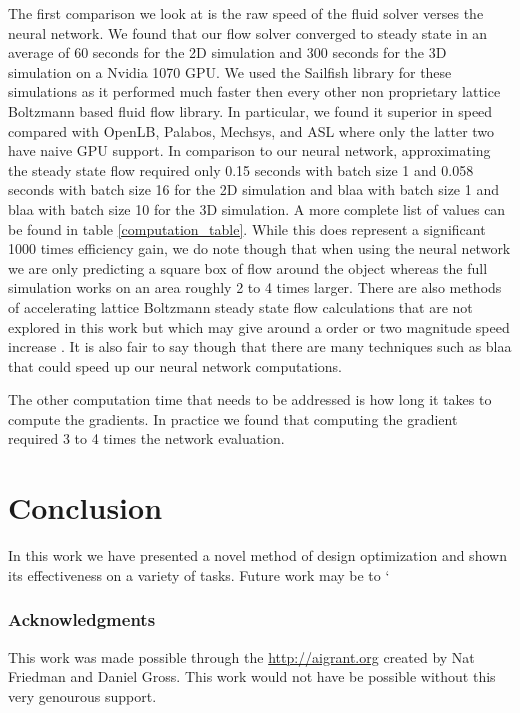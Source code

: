 \documentclass{article} %
\begin{document}
The first comparison we look at is the raw speed of the fluid solver verses the neural network. We found that our flow solver converged to steady state in an average of 60 seconds for the 2D simulation and 300 seconds for the 3D simulation on a Nvidia 1070 GPU. We used the Sailfish library \cite{januszewski2014sailfish} for these simulations as it performed much faster then every other non proprietary lattice Boltzmann based fluid flow library. In particular, we found it superior in speed compared with OpenLB, Palabos, Mechsys, and ASL where only the latter two have naive GPU support. In comparison to our neural network, approximating the steady state flow required only 0.15 seconds with batch size 1 and 0.058 seconds with batch size 16 for the 2D simulation and blaa with batch size 1 and blaa with batch size 10 for the 3D simulation. A more complete list of values can be found in table \ref{computation_table}. While this does represent a significant 1000 times efficiency gain, we do note though that when using the neural network we are only predicting a square box of flow around the object whereas the full simulation works on an area roughly 2 to 4 times larger. There are also methods of accelerating lattice Boltzmann steady state flow calculations that are not explored in this work but which may give around a order or two magnitude speed increase \cite{guo2013lattice} \cite{bernaschi2002computing}. It is also fair to say though that there are many techniques such as blaa that could speed up our neural network computations.

The other computation time that needs to be addressed is how long it takes to compute the gradients. In practice we found that computing the gradient required 3 to 4 times the network evaluation.




\section{Conclusion}

In this work we have presented a novel method of design optimization and shown its effectiveness on a variety of tasks. Future work may be to `

\subsubsection*{Acknowledgments}

This work was made possible through the \url{http://aigrant.org} created by Nat Friedman and Daniel Gross. This work would not have be possible without this very genourous support.
\end{document}
